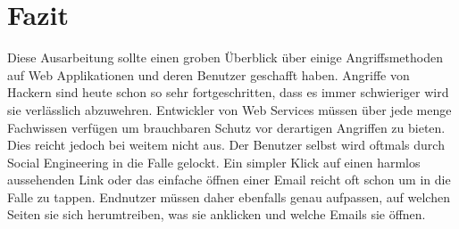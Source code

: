 \section{Fazit}
Diese Ausarbeitung sollte einen groben \"Uberblick \"uber einige Angriffsmethoden auf Web Applikationen und deren Benutzer geschafft haben. Angriffe von Hackern sind heute schon so sehr fortgeschritten, dass es immer schwieriger wird sie verl\"asslich abzuwehren. Entwickler von Web Services m\"ussen \"uber jede menge Fachwissen verf\"ugen um brauchbaren Schutz vor derartigen Angriffen zu bieten. Dies reicht jedoch bei weitem nicht aus. Der Benutzer selbst wird oftmals durch Social Engineering in die Falle gelockt. Ein simpler Klick auf einen harmlos aussehenden Link oder das einfache \"offnen einer Email reicht oft schon um in die Falle zu tappen. Endnutzer m\"ussen daher ebenfalls genau aufpassen, auf welchen Seiten sie sich herumtreiben, was sie anklicken und welche Emails sie \"offnen.